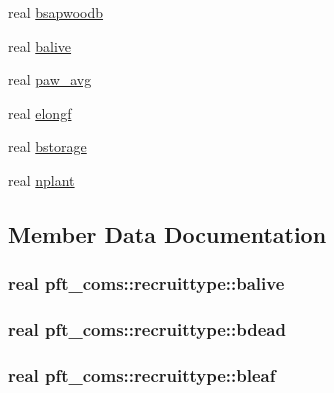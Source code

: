 \begin{DoxyCompactItemize}
\item 
real \hyperlink{structpft__coms_1_1recruittype_aa212a897e4e1741b1f0bbcc35a34a1bd}{bsapwoodb}
\item 
real \hyperlink{structpft__coms_1_1recruittype_ad4aba73ec3b526ea8c0e2ee5641cb988}{balive}
\item 
real \hyperlink{structpft__coms_1_1recruittype_a8c5c9e4dd1c79535ab5b03e8b5a5a981}{paw\+\_\+avg}
\item 
real \hyperlink{structpft__coms_1_1recruittype_ac83204f451c9483aa4a078453970602e}{elongf}
\item 
real \hyperlink{structpft__coms_1_1recruittype_af49417a4c10681ac32f8e4f0ee7a52b5}{bstorage}
\item 
real \hyperlink{structpft__coms_1_1recruittype_af6c130e8404bba50cc5d84f9d0619665}{nplant}
\end{DoxyCompactItemize}


\subsection{Member Data Documentation}
\hypertarget{structpft__coms_1_1recruittype_ad4aba73ec3b526ea8c0e2ee5641cb988}{}
\subsubsection[{balive}]{\setlength{\rightskip}{0pt plus 5cm}real pft\+\_\+coms\+::recruittype\+::balive}\label{structpft__coms_1_1recruittype_ad4aba73ec3b526ea8c0e2ee5641cb988}
\hypertarget{structpft__coms_1_1recruittype_adbd20b6840a8ccdd160cd2ccea8dcca1}{}
\subsubsection[{bdead}]{\setlength{\rightskip}{0pt plus 5cm}real pft\+\_\+coms\+::recruittype\+::bdead}\label{structpft__coms_1_1recruittype_adbd20b6840a8ccdd160cd2ccea8dcca1}
\hypertarget{structpft__coms_1_1recruittype_a9ad80c7a2b183b1bd3c799425f5641d0}{}
\subsubsection[{bleaf}]{\setlength{\rightskip}{0pt plus 5cm}real pft\+\_\+coms\+::recruittype\+::bleaf}\label{structpft__coms_1_1recruittype_a9ad80c7a2b183b1bd3c799425f5641d0}
\hypertarget{structpft__coms_1_1recruittype_a47ef4fb7a134ea59298a87b80da1b29f}{}
